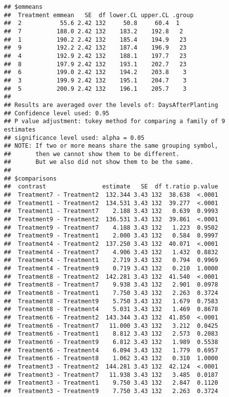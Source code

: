 \documentclass[
]{article}
\begin{document}
\begin{verbatim}
## $emmeans
##  Treatment emmean   SE  df lower.CL upper.CL .group
##  2           55.6 2.42 132     50.8     60.4  1    
##  7          188.0 2.42 132    183.2    192.8   2   
##  1          190.2 2.42 132    185.4    194.9   23  
##  9          192.2 2.42 132    187.4    196.9   23  
##  4          192.9 2.42 132    188.1    197.7   23  
##  8          197.9 2.42 132    193.1    202.7   23  
##  6          199.0 2.42 132    194.2    203.8    3  
##  3          199.9 2.42 132    195.1    204.7    3  
##  5          200.9 2.42 132    196.1    205.7    3  
## 
## Results are averaged over the levels of: DaysAfterPlanting 
## Confidence level used: 0.95 
## P value adjustment: tukey method for comparing a family of 9 estimates 
## significance level used: alpha = 0.05 
## NOTE: If two or more means share the same grouping symbol,
##       then we cannot show them to be different.
##       But we also did not show them to be the same. 
## 
## $comparisons
##  contrast                estimate   SE  df t.ratio p.value
##  Treatment7 - Treatment2  132.344 3.43 132  38.638  <.0001
##  Treatment1 - Treatment2  134.531 3.43 132  39.277  <.0001
##  Treatment1 - Treatment7    2.188 3.43 132   0.639  0.9993
##  Treatment9 - Treatment2  136.531 3.43 132  39.861  <.0001
##  Treatment9 - Treatment7    4.188 3.43 132   1.223  0.9502
##  Treatment9 - Treatment1    2.000 3.43 132   0.584  0.9997
##  Treatment4 - Treatment2  137.250 3.43 132  40.071  <.0001
##  Treatment4 - Treatment7    4.906 3.43 132   1.432  0.8832
##  Treatment4 - Treatment1    2.719 3.43 132   0.794  0.9969
##  Treatment4 - Treatment9    0.719 3.43 132   0.210  1.0000
##  Treatment8 - Treatment2  142.281 3.43 132  41.540  <.0001
##  Treatment8 - Treatment7    9.938 3.43 132   2.901  0.0978
##  Treatment8 - Treatment1    7.750 3.43 132   2.263  0.3724
##  Treatment8 - Treatment9    5.750 3.43 132   1.679  0.7583
##  Treatment8 - Treatment4    5.031 3.43 132   1.469  0.8678
##  Treatment6 - Treatment2  143.344 3.43 132  41.850  <.0001
##  Treatment6 - Treatment7   11.000 3.43 132   3.212  0.0425
##  Treatment6 - Treatment1    8.812 3.43 132   2.573  0.2083
##  Treatment6 - Treatment9    6.812 3.43 132   1.989  0.5538
##  Treatment6 - Treatment4    6.094 3.43 132   1.779  0.6957
##  Treatment6 - Treatment8    1.062 3.43 132   0.310  1.0000
##  Treatment3 - Treatment2  144.281 3.43 132  42.124  <.0001
##  Treatment3 - Treatment7   11.938 3.43 132   3.485  0.0187
##  Treatment3 - Treatment1    9.750 3.43 132   2.847  0.1120
##  Treatment3 - Treatment9    7.750 3.43 132   2.263  0.3724

\end{verbatim}
\end{document}
